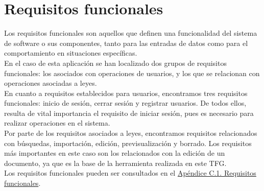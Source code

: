 \section{Requisitos funcionales}

Los requisitos funcionales \cite{requisitos} son aquellos que definen una funcionalidad del sistema de software o sus componentes, tanto para las entradas de datos como para el comportamiento en situaciones específicas.
\\

En el caso de esta aplicación se han localizado dos grupos de requisitos funcionales: los asociados con operaciones de usuarios, y los que se relacionan con operaciones asociadas a leyes.
\\

En cuanto a requisitos establecidos para usuarios, encontramos tres requisitos funcionales: inicio de sesión, cerrar sesión y registrar usuarios. De todos ellos, resulta de vital importancia el requisito de iniciar sesión, pues es necesario para realizar operaciones en el sistema.
\\

Por parte de los requisitos asociados a leyes, encontramos requisitos relacionados con búsquedas, importación, edición, previsualización y borrado. Los requisitos más importantes en este caso son los relacionados con la edición de un documento, ya que es la base de la herramienta realizada en este TFG.
\\

Los requisitos funcionales pueden ser consultados en el \hyperref[APRequisitosFuncionales]{Apéndice C.1. Requisitos funcionales}.